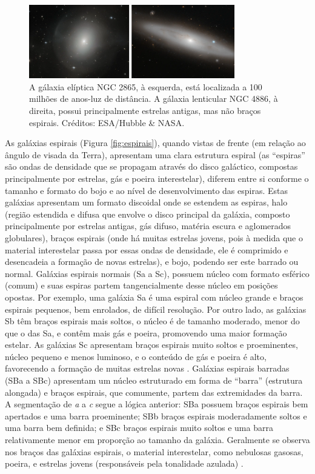 \begin{figure}[h] 
  \centering 
  \includegraphics[width=0.8\textwidth]{Imagens/eliptica_lenticular.png} 
  \caption[Gálaxia elíptica NGC 2865 e gálaxia lenticular NGC 4886.]{A gálaxia elíptica NGC 2865, à esquerda, está localizada a 100 milhões de anos-luz de distância. A gálaxia lenticular NGC 4886, à direita, possui principalmente estrelas antigas, mas não braços espirais. Créditos: ESA/Hubble \& NASA.}
  \label{fig:eliptica_lenticular} 
\end{figure}

As galáxias espirais (Figura \ref{fig:espirais}), quando vistas de frente (em relação ao ângulo de visada da Terra), apresentam uma clara estrutura espiral (as ``espiras'' são ondas de densidade que se propagam através do disco galáctico, compostas principalmente por estrelas, gás e poeira interestelar), diferem entre si conforme o tamanho e formato do bojo e ao nível de desenvolvimento das espiras. Estas galáxias apresentam um formato discoidal onde se estendem as espiras, halo (região estendida e difusa que envolve o disco principal da galáxia, composto principalmente por estrelas antigas, gás difuso, matéria escura e aglomerados globulares), braços espirais (onde há muitas estrelas jovens, pois à medida que o material interestelar passa por essas ondas de densidade, ele é comprimido e desencadeia a formação de novas estrelas), e bojo, podendo ser este barrado ou normal. Galáxias espirais normais (Sa a Sc), possuem núcleo com formato esférico (comum) e suas espiras partem tangencialmente desse núcleo em posições opostas. Por exemplo, uma galáxia Sa é uma espiral com núcleo grande e braços espirais pequenos, bem enrolados, de difícil resolução. Por outro lado, as galáxias Sb têm braços espirais mais soltos, o núcleo é de tamanho moderado, menor do que o das Sa, e contêm mais gás e poeira, promovendo uma maior formação estelar. As galáxias Sc apresentam braços espirais muito soltos e proeminentes, núcleo pequeno e menos luminoso, e o conteúdo de gás e poeira é alto, favorecendo a formação de muitas estrelas novas \cite{2023Kepler,2022gastao}. Galáxias espirais barradas (SBa a SBc) apresentam um núcleo estruturado em forma de ``barra'' (estrutura alongada) e braços espirais, que comumente, partem das extremidades da barra. A segmentação de \emph{a} a \emph{c} segue a lógica anterior: SBa possuem braços espirais bem apertados e uma barra proeminente; SBb braços espirais moderadamente soltos e uma barra bem definida; e SBc braços espirais muito soltos e uma barra relativamente menor em proporção ao tamanho da galáxia. Geralmente se observa nos braços das galáxias espirais, o material interestelar, como nebulosas gasosas, poeira, e estrelas jovens (responsáveis pela tonalidade azulada) \cite{2023Kepler}.


